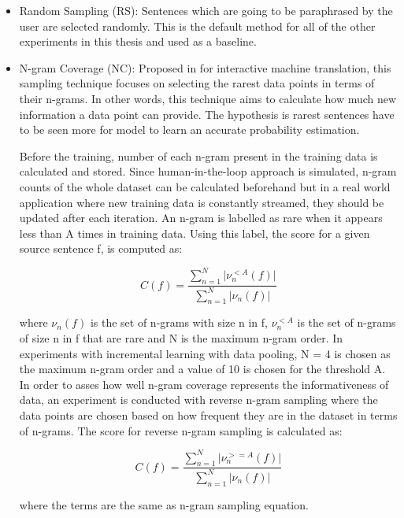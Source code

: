\begin{itemize}

\item Random Sampling (RS): Sentences which are going to be paraphrased by the user are selected randomly. This is the default method for all of the other experiments in this thesis and used as a baseline.

\item N-gram Coverage (NC): Proposed in \cite{rubio} for interactive machine translation, this sampling technique focuses on selecting the rarest data points in terms of their n-grams. In other words, this technique aims to calculate how much new information a data point can provide. The hypothesis is rarest sentences have to be seen more for model to learn an accurate probability estimation. 

Before the training, number of each n-gram present in the training data is calculated and stored. Since human-in-the-loop approach is simulated, n-gram counts of the whole dataset can be calculated beforehand but in a real world application where new training data is constantly streamed, they should be updated after each iteration. An n-gram is labelled as rare when it appears less than A times in training data. Using this label, the score for a given source sentence f, is computed as:

\begin{equation}
C(f) = \frac{\sum_{n=1}^N \lvert{\nu^{<A}_{n}(f)} \lvert} {\sum_{n=1}^N \lvert{\nu_{n}(f)} \lvert} 
\end{equation}


where ${\nu_{n}(f)}$ is the set of n-grams with size n in f, ${\nu^{<A}_{n}}$ is the set of n-grams of size n in f that are rare and N is the maximum n-gram order. In experiments with incremental learning with data pooling, N = 4 is chosen as the maximum n-gram order and a value of 10 is chosen for the threshold A. In order to asses how well n-gram coverage represents the informativeness of data, an experiment is conducted with reverse n-gram sampling where the data points are chosen based on how frequent they are in the dataset in terms of n-grams. The score for reverse n-gram sampling is calculated as:

\begin{equation}
C(f) = \frac{\sum_{n=1}^N \lvert{\nu^{>=A}_{n}(f)} \lvert} {\sum_{n=1}^N \lvert{\nu_{n}(f)} \lvert} 
\end{equation}

where the terms are the same as n-gram sampling equation.


\end{itemize}

